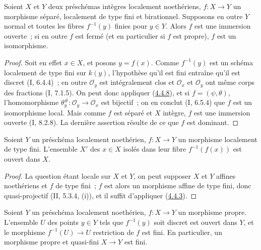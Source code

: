 \begin{corollary}[4.4.9]
\label{III.4.4.9-fr}
Soient $X$ et $Y$ deux préschémas intègres localement noethériens, $f:X\to Y$ un
morphisme séparé, localement de type fini et birationnel. Supposons en outre $Y$ normal
et toutes les fibres $f^{-1}(y)$ finies pour $y\in Y$. Alors $f$ est une
immersion ouverte~; si en outre $f$ est fermé (et en particulier si $f$ est
propre), $f$ est un isomorphisme.
\end{corollary}

\begin{proof}
Soit en effet $x\in X$, et posons $y=f(x)$. Comme $f^{-1}(y)$ est un schéma
localement de type fini sur $k(y)$, l'hypothèse qu'il est fini entraîne qu'il est discret
(I, 6.4.4)~; en outre $\mathcal O_y$ est intégralement clos et
$\mathcal O_x$ et $\mathcal O_y$ ont même corps des fractions (I, 7.1.5).
On peut donc appliquer (\hyperref[III.4.4.8-fr]{4.4.8}), et si
$f=(\psi,\theta)$, l'homomorphisme
$\theta_y^\#:\mathcal O_y\to\mathcal O_x$ est bijectif~; on en conclut
(I, 6.5.4) que $f$ est un isomorphisme local. Mais comme $f$ est séparé et
$X$ intègre, $f$ est une immersion ouverte (I, 8.2.8). La dernière assertion
résulte de ce que $f$ est dominant.
\end{proof}

\begin{proposition}[4.4.10]
\label{III.4.4.10-fr}
Soient $Y$ un préschéma localement noethérien, $f:X\to Y$ un morphisme
localement de type fini. L'ensemble $X'$ des $x\in X$ isolés dans leur fibre
$f^{-1}(f(x))$ est ouvert dans $X$.
\end{proposition}

\begin{proof}
La question étant locale sur $X$ et $Y$, on peut supposer $X$ et $Y$ affines
noethériens et $f$ de type fini~; $f$ est alors un morphisme affine de type
fini, donc quasi-projectif (II, 5.3.4, (i)), et il suffit d'appliquer
(\hyperref[III.4.4.3-fr]{4.4.3}).
\end{proof}


\begin{corollary}[4.4.11]
\label{III.4.4.11-fr}
Soient $Y$ un préschéma localement noethérien, $f:X\to Y$ un morphisme
propre. L'ensemble $U$ des points $y\in Y$ tels que $f^{-1}(y)$ soit discret
est ouvert dans $Y$, et le morphisme $f^{-1}(U)\to U$ restriction de $f$ est
fini. En particulier, un morphisme propre et quasi-fini $X\to Y$ est fini.
\end{corollary}

